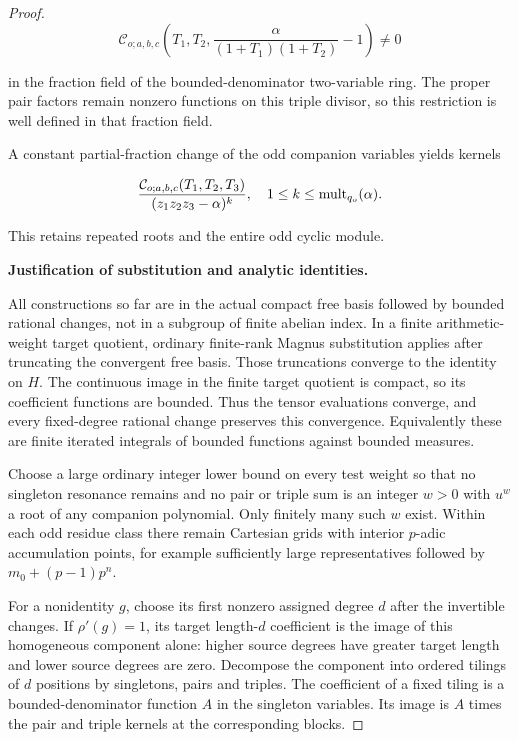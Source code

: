 \begin{proof}
\[
\mathcal C_{o;a,b,c}
 \left(T_1,T_2,\frac{\alpha}{(1+T_1)(1+T_2)}-1\right)\ne0
\tag{CU.1}
\]

in the fraction field of the bounded-denominator two-variable ring. The proper pair factors remain nonzero functions on this triple divisor, so this restriction is well defined in that fraction field.

A constant partial-fraction change of the odd companion variables yields kernels

\[
\frac{\mathcal C_{o;a,b,c}(T_1,T_2,T_3)}
 {(z_1z_2z_3-\alpha)^k},
\quad 1\le k\le {\rm mult}_{q_o}(\alpha).
\]

This retains repeated roots and the entire odd cyclic module.

\par\medskip\noindent\textbf{Justification of substitution and analytic identities.}

All constructions so far are in the actual compact free basis followed by bounded rational changes, not in a subgroup of finite abelian index. In a finite arithmetic-weight target quotient, ordinary finite-rank Magnus substitution applies after truncating the convergent free basis. Those truncations converge to the identity on \(H\). The continuous image in the finite target quotient is compact, so its coefficient functions are bounded. Thus the tensor evaluations converge, and every fixed-degree rational change preserves this convergence. Equivalently these are finite iterated integrals of bounded functions against bounded measures.

Choose a large ordinary integer lower bound on every test weight so that no singleton resonance remains and no pair or triple sum is an integer \(w>0\) with \(u^w\) a root of any companion polynomial. Only finitely many such \(w\) exist. Within each odd residue class there remain Cartesian grids with interior \(p\)-adic accumulation points, for example sufficiently large representatives followed by \(m_0+(p-1)p^n\).

For a nonidentity \(g\), choose its first nonzero assigned degree \(d\) after the invertible changes. If \(\rho'(g)=1\), its target length-\(d\) coefficient is the image of this homogeneous component alone: higher source degrees have greater target length and lower source degrees are zero. Decompose the component into ordered tilings of \(d\) positions by singletons, pairs and triples. The coefficient of a fixed tiling is a bounded-denominator function \(A\) in the singleton variables. Its image is \(A\) times the pair and triple kernels at the corresponding blocks.


\end{proof}
